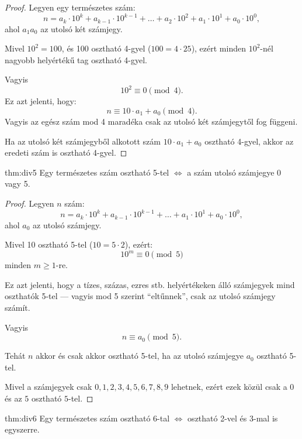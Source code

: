 \begin{proof}
Legyen egy természetes szám: 
\[
n=a_{k}\cdot10^{k}+a_{k-1}\cdot10^{k-1}+\dots+a_{2}\cdot10^{2}+a_{1}\cdot10^{1}+a_{0}\cdot10^{0},
\]
ahol $a_{1}a_{0}$ az utolsó két számjegy.

Mivel $10^{2}=100$, és 100 osztható 4-gyel ($100=4\cdot25$), ezért
minden $10^{2}$-nél nagyobb helyértékű tag osztható 4-gyel.

Vagyis 
\[
10^{2}\equiv0\pmod 4.
\]
Ez azt jelenti, hogy: 
\[
n\equiv10\cdot a_{1}+a_{0}\pmod 4.
\]
Vagyis az egész szám mod 4 maradéka csak az utolsó két számjegytől
fog függeni.

Ha az utolsó két számjegyből alkotott szám $10\cdot a_{1}+a_{0}$
osztható 4-gyel, akkor az eredeti szám is osztható 4-gyel.
\end{proof}
\begin{theorem}{thm:div5}
Egy természetes szám osztható 5-tel $\iff$ a szám utolsó számjegye
0 vagy 5.
\end{theorem}

\begin{proof}
Legyen $n$ szám: 
\[
n=a_{k}\cdot10^{k}+a_{k-1}\cdot10^{k-1}+\dots+a_{1}\cdot10^{1}+a_{0}\cdot10^{0},
\]
ahol $a_{0}$ az utolsó számjegy.

Mivel 10 osztható 5-tel ($10=5\cdot2$), ezért: 
\[
10^{m}\equiv0\pmod 5
\]
minden $m\geq1$-re.

Ez azt jelenti, hogy a tízes, százas, ezres stb. helyértékeken álló
számjegyek mind oszthatók 5-tel --- vagyis mod 5 szerint ``eltűnnek'',
csak az utolsó számjegy számít.

Vagyis 
\[
n\equiv a_{0}\pmod 5.
\]

Tehát $n$ akkor és csak akkor osztható 5-tel, ha az utolsó számjegye
$a_{0}$ osztható 5-tel.

Mivel a számjegyek csak $0,1,2,3,4,5,6,7,8,9$ lehetnek, ezért ezek
közül csak a $0$ és az $5$ osztható $5$-tel.
\end{proof}
\begin{theorem}{thm:div6}
Egy természetes szám osztható 6-tal $\iff$ osztható 2-vel és 3-mal
is egyszerre.
\end{theorem}

